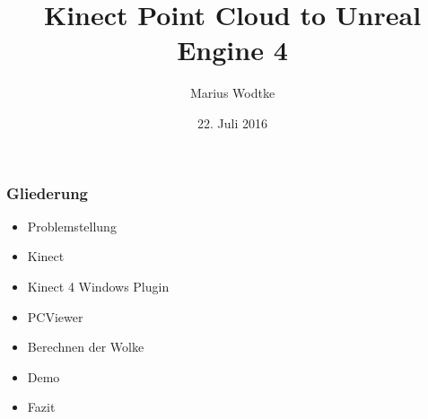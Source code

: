 \documentclass[18pt]{beamer}
\institute{Seminar: Anthropomatik praktisch erfahren}
\title[Kinect Point Cloud tu UE4]{Kinect Point Cloud to Unreal Engine 4}
\subtitle{}
\author{Marius Wodtke}
\date{22. Juli 2016}
\begin{document}
\begin{frame}
	\titlepage
\end{frame}

\begin{frame}
    \frametitle{Gliederung}
    \tableofcontents
    \begin{itemize}
    	\item Problemstellung
    	\item Kinect
    	\item Kinect 4 Windows Plugin
    	\item PCViewer
    	\item Berechnen der Wolke
    	\item Demo
    	\item Fazit
    \end{itemize}
\end{frame}
\end{document}
